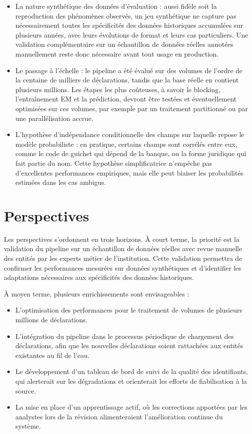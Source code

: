 \begin{itemize}
    \item La nature synthétique des données d'évaluation : aussi fidèle soit la reproduction des phénomènes observés, un jeu synthétique ne capture pas nécessairement toutes les spécificités des données historiques accumulées sur plusieurs années, avec leurs évolutions de format et leurs cas particuliers. Une validation complémentaire sur un échantillon de données réelles annotées manuellement reste donc nécessaire avant tout usage en production.
    \item Le passage à l'échelle : le pipeline a été évalué sur des volumes de l'ordre de la centaine de milliers de déclarations, tandis que la base réelle en contient plusieurs millions. Les étapes les plus coûteuses, à savoir le blocking, l'entraînement EM et la prédiction, devront être testées et éventuellement optimisées sur ces volumes, par exemple par un traitement partitionné ou par une parallélisation accrue.
    \item L'hypothèse d'indépendance conditionnelle des champs sur laquelle repose le modèle probabiliste : en pratique, certains champs sont corrélés entre eux, comme le code de guichet qui dépend de la banque, ou la forme juridique qui fait partie du nom. Cette hypothèse simplificatrice n'empêche pas d'excellentes performances empiriques, mais elle peut biaiser les probabilités estimées dans les cas ambigus.
\end{itemize}

\section{Perspectives}

Les perspectives s'ordonnent en trois horizons. À court terme, la priorité est la validation du pipeline sur un échantillon de données réelles avec revue manuelle des entités par les experts métier de l'institution. Cette validation permettra de confirmer les performances mesurées sur données synthétiques et d'identifier les adaptations nécessaires aux spécificités des données historiques.

À moyen terme, plusieurs enrichissements sont envisageables :

\begin{itemize}
    \item L'optimisation des performances pour le traitement de volumes de plusieurs millions de déclarations.
    \item L'intégration du pipeline dans le processus périodique de chargement des déclarations, afin que les nouvelles déclarations soient rattachées aux entités existantes au fil de l'eau.
    \item Le développement d'un tableau de bord de suivi de la qualité des identifiants, qui alerterait sur les dégradations et orienterait les efforts de fiabilisation à la source.
    \item La mise en place d'un apprentissage actif, où les corrections apportées par les analystes lors de la révision alimenteraient l'amélioration continue du système.
\end{itemize}

